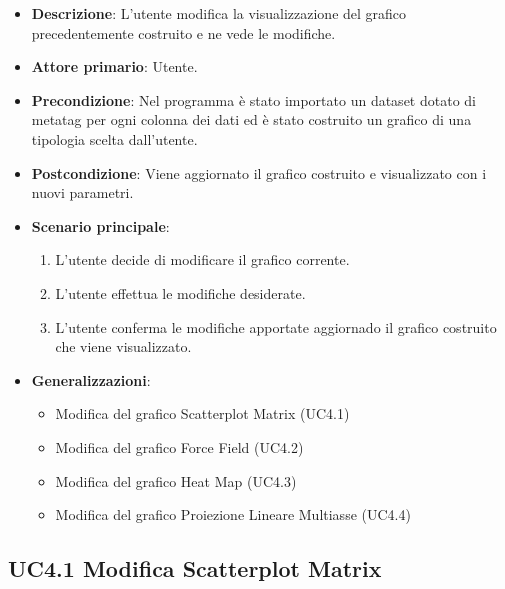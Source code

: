 \begin{itemize}
    \item \textbf{Descrizione}: L’utente modifica la visualizzazione del grafico precedentemente costruito
                                e ne vede le modifiche.
	
    \item \textbf{Attore primario}: Utente.
    
    \item \textbf{Precondizione}:   Nel programma è stato importato un dataset dotato di metatag per ogni
                                    colonna dei dati ed è stato costruito un grafico di una tipologia scelta dall'utente.

    \item \textbf{Postcondizione}:  Viene aggiornato il grafico costruito e visualizzato con i nuovi parametri.

	\item \textbf{Scenario principale}:
		\begin{enumerate}
			\item L'utente decide di modificare il grafico corrente.
			\item L'utente effettua le modifiche desiderate.
            \item L'utente conferma le modifiche apportate aggiornado il grafico costruito che viene visualizzato.
        \end{enumerate}

    \item \textbf{Generalizzazioni}:
        \begin{itemize}
            \item Modifica del grafico Scatterplot Matrix (UC4.1)
            \item Modifica del grafico Force Field (UC4.2)
            \item Modifica del grafico Heat Map (UC4.3)
            \item Modifica del grafico Proiezione Lineare Multiasse (UC4.4)
        \end{itemize}
\end{itemize}


\subsection{UC4.1 Modifica Scatterplot Matrix}





